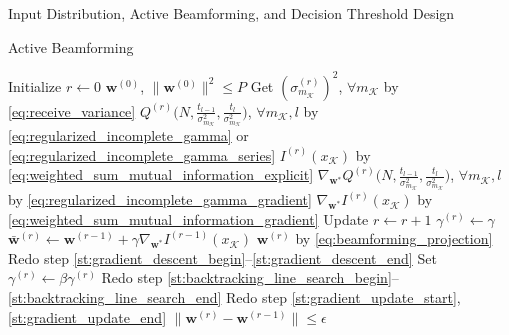 \documentclass[journal]{IEEEtran}
\begin{document}
\begin{section}{Input Distribution, Active Beamforming, and Decision Threshold Design}
\begin{subsection}{Active Beamforming}
\begin{algorithm}[!t]
\begin{algorithmic}[1]
				\State Initialize $r \gets 0$
				\State \phantom{Initialize} $\boldsymbol{w}^{(0)}$, $\lVert\boldsymbol{w}^{(0)}\rVert^2 \le P$
				\State Get $(\sigma_{m_{\mathcal{K}}}^{(r)})^2$, $\forall m_{\mathcal{K}}$ by \eqref{eq:receive_variance} \label{st:gradient_descent_begin}
				\State \phantom{Get} $Q^{(r)}\bigl(N,\frac{t_{l-1}}{\sigma_{m_{\mathcal{K}}}^2},\frac{t_l}{\sigma_{m_{\mathcal{K}}}^2}\bigr)$, $\forall m_{\mathcal{K}},l$ by \eqref{eq:regularized_incomplete_gamma} or \eqref{eq:regularized_incomplete_gamma_series}
				\State \phantom{Get} $I^{(r)}(x_{\mathcal{K}})$ by \eqref{eq:weighted_sum_mutual_information_explicit} \label{st:gradient_descent_end}
				\State \phantom{Get} $\nabla_{\boldsymbol{w}^*} Q^{(r)}\bigl(N,\frac{t_{l-1}}{\sigma_{m_{\mathcal{K}}}^2},\frac{t_l}{\sigma_{m_{\mathcal{K}}}^2}\bigr)$, $\forall m_{\mathcal{K}},l$ by \eqref{eq:regularized_incomplete_gamma_gradient} \label{st:gradient_update_start}
				\State \phantom{Get} $\nabla_{\boldsymbol{w}^*} I^{(r)}(x_{\mathcal{K}})$ by \eqref{eq:weighted_sum_mutual_information_gradient} \label{st:gradient_update_end}
				\Repeat
					\State Update $r \gets r+1$
					\State \phantom{Update} $\gamma^{(r)}\gets\gamma$
					\State \phantom{Update} $\bar{\boldsymbol{w}}^{(r)} \gets \boldsymbol{w}^{(r-1)}+\gamma\nabla_{\boldsymbol{w}^*} I^{(r-1)}(x_{\mathcal{K}})$ \label{st:backtracking_line_search_begin}
					\State \phantom{Update} $\boldsymbol{w}^{(r)}$ by \eqref{eq:beamforming_projection}
					\State Redo step \ref{st:gradient_descent_begin}--\ref{st:gradient_descent_end} \label{st:backtracking_line_search_end}
						\State Set $\gamma^{(r)}\gets\beta\gamma^{(r)}$
						\State Redo step \ref{st:backtracking_line_search_begin}--\ref{st:backtracking_line_search_end}
					\EndWhile
					\State Redo step \ref{st:gradient_update_start}, \ref{st:gradient_update_end}
				\Until $\lVert\boldsymbol{w}^{(r)}-\boldsymbol{w}^{(r-1)}\rVert \le \epsilon$
			\end{algorithmic}
		\end{algorithm}
	\end{subsection}


\end{section}
\end{document}
